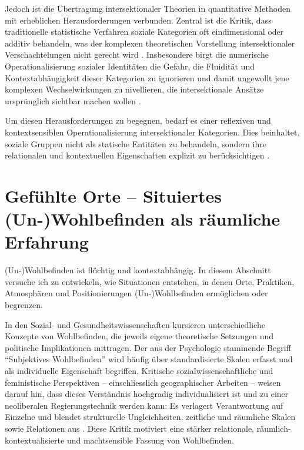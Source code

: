 Jedoch ist die Übertragung intersektionaler Theorien in quantitative Methoden mit erheblichen Herausforderungen verbunden. Zentral ist die Kritik, dass traditionelle statistische Verfahren soziale Kategorien oft eindimensional oder additiv behandeln, was der komplexen theoretischen Vorstellung intersektionaler Verschachtelungen nicht gerecht wird \parencite{hancockWhenMultiplicationDoesnt2007, bowlegInvitedReflectionQuantifying2016}. Insbesondere birgt die numerische Operationalisierung sozialer Identitäten die Gefahr, die Fluidität und Kontextabhängigkeit dieser Kategorien zu ignorieren und damit ungewollt jene komplexen Wechselwirkungen zu nivellieren, die intersektionale Ansätze ursprünglich sichtbar machen wollen \parencite{scottIntersectionalityQuantitativeMethods2017}.

Um diesen Herausforderungen zu begegnen, bedarf es einer reflexiven und kontextsensiblen Operationalisierung intersektionaler Kategorien. Dies beinhaltet, soziale Gruppen nicht als statische Entitäten zu behandeln, sondern ihre relationalen und kontextuellen Eigenschaften explizit zu berücksichtigen \parencite{rodo-de-zarateDevelopingGeographiesIntersectionality2014, websterCenteringSocialtechnicalRelations2021}.


\section{Gefühlte Orte -- Situiertes (Un-)Wohlbefinden als räumliche Erfahrung}

(Un-)Wohlbefinden ist flüchtig und kontextabhängig. In diesem Abschnitt versuche ich zu entwickeln, wie Situationen entstehen, in denen Orte, Praktiken, Atmosphären und Positionierungen (Un-)Wohlbefinden ermöglichen oder begrenzen.

In den Sozial- und Gesundheitswissenschaften kursieren unterschiedliche Konzepte von Wohlbefinden, die jeweils eigene theoretische Setzungen und politische Implikationen mittragen. Der aus der Psychologie stammende Begriff \enquote{Subjektives Wohlbefinden} wird häufig über standardisierte Skalen erfasst und als individuelle Eigenschaft begriffen. Kritische sozialwissenschaftliche und feministische Perspektiven -- einschliesslich geographischer Arbeiten -- weisen darauf hin, dass dieses Verständnis hochgradig individualisiert ist und zu einer neoliberalen Regierungstechnik werden kann: Es verlagert Verantwortung auf Einzelne und blendet strukturelle Ungleichheiten, zeitliche und räumliche Skalen sowie Relationen aus \parencite{atkinsonToxicEffectsSubjective2021}. Diese Kritik motiviert eine stärker relationale, räumlich-kontextualisierte und machtsensible Fassung von Wohlbefinden.

